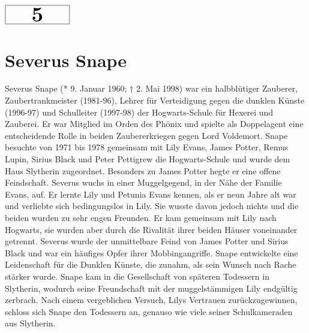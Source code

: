 \documentclass[a4paper, 10pt]{article}
\begin{document}
\begin{minipage}[t]{\textwidth}
    \vspace*{-1.5cm} %
    \begin{flushright}
        \hspace*{\fill} %
        $\boxed{\textbf{\Huge\phantom{00}5\phantom{00}}}$ %
    \end{flushright}
\end{minipage}

\section*{\huge Severus Snape}
Severus Snape (* 9. Januar 1960; † 2. Mai 1998) war ein halbblütiger Zauberer, Zaubertrankmeister (1981-96), Lehrer für Verteidigung gegen die dunklen Künste (1996-97) und Schulleiter (1997-98) der Hogwarts-Schule für Hexerei und Zauberei. Er war Mitglied im Orden des Phönix und spielte als Doppelagent eine entscheidende Rolle in beiden Zaubererkriegen gegen Lord Voldemort.
\vspace{10pt}
\newline
Snape besuchte von 1971 bis 1978 gemeinsam mit Lily Evans, James Potter, Remus Lupin, Sirius Black und Peter Pettigrew die Hogwarts-Schule und wurde dem Haus Slytherin zugeordnet. Besonders zu James Potter hegte er eine offene Feindschaft.
\vspace{10pt}
\newline
Severus wuchs in einer Muggelgegend, in der Nähe der Familie Evans, auf. Er lernte Lily und Petunia Evans kennen, als er neun Jahre alt war und verliebte sich bedingungslos in Lily. Sie wusste davon jedoch nichts und die beiden wurden zu sehr engen Freunden. Er kam gemeinsam mit Lily nach Hogwarts, sie wurden aber durch die Rivalität ihrer beiden Häuser voneinander getrennt. Severus wurde der unmittelbare Feind von James Potter und Sirius Black und war ein häufiges Opfer ihrer Mobbingangriffe. Snape entwickelte eine Leidenschaft für die Dunklen Künste, die zunahm, als sein Wunsch nach Rache stärker wurde. Snape kam in die Gesellschaft von späteren Todessern in Slytherin, wodurch seine Freundschaft mit der muggelstämmigen Lily endgültig zerbrach. Nach einem vergeblichen Versuch, Lilys Vertrauen zurückzugewinnen, schloss sich Snape den Todessern an, genauso wie viele seiner Schulkameraden aus Slytherin.
\vspace{10pt}
\newline
\end{document}
